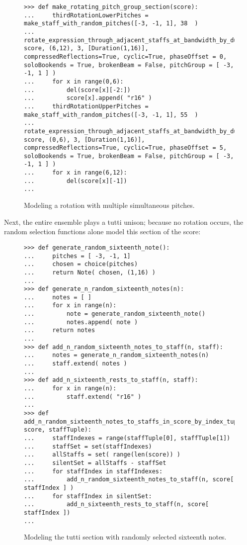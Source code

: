 \begin{figure}[H]
\begin{lstlisting}[basicstyle=\scriptsize\ttfamily, breaklines=True, tabsize=4, showtabs=false, showspaces=false]
>>> def make_rotating_pitch_group_section(score):
...     thirdRotationLowerPitches = make_staff_with_random_pitches([-3, -1, 1], 38  )   
...     rotate_expression_through_adjacent_staffs_at_bandwidth_by_durations(thirdRotationLowerPitches, score, (6,12), 3, [Duration(1,16)], compressedReflections=True, cyclic=True, phaseOffset = 0, soloBookends = True, brokenBeam = False, pitchGroup = [ -3, -1, 1 ] )
...     for x in range(0,6):
...         del(score[x][-2:])
...         score[x].append( "r16" )
...     thirdRotationUpperPitches = make_staff_with_random_pitches([-3, -1, 1], 55  )   
...     rotate_expression_through_adjacent_staffs_at_bandwidth_by_durations(thirdRotationUpperPitches, score, (0,6), 3, [Duration(1,16)], compressedReflections=True, cyclic=True, phaseOffset = 5, soloBookends = True, brokenBeam = False, pitchGroup = [ -3, -1, 1 ] )
...     for x in range(6,12):
...         del(score[x][-1])
... \end{lstlisting}

\caption{Modeling a rotation with multiple simultaneous pitches. } 
\end{figure}

Next, the entire ensemble plays a tutti unison; because no rotation occurs, the random selection functions alone model this section of the score:

\begin{figure}[H]
\begin{lstlisting}[basicstyle=\scriptsize\ttfamily, breaklines=True, tabsize=4, showtabs=false, showspaces=false]
>>> def generate_random_sixteenth_note():
...     pitches = [ -3, -1, 1]
...     chosen = choice(pitches)
...     return Note( chosen, (1,16) )
... 
>>> def generate_n_random_sixteenth_notes(n):
...     notes = [ ]
...     for x in range(n):
...         note = generate_random_sixteenth_note()
...         notes.append( note )
...     return notes
... 
>>> def add_n_random_sixteenth_notes_to_staff(n, staff):
...     notes = generate_n_random_sixteenth_notes(n)
...     staff.extend( notes )
... 
>>> def add_n_sixteenth_rests_to_staff(n, staff):
...     for x in range(n):
...         staff.extend( "r16" )
... 
>>> def add_n_random_sixteenth_notes_to_staffs_in_score_by_index_tuple(n, score, staffTuple):
...     staffIndexes = range(staffTuple[0], staffTuple[1])
...     staffSet = set(staffIndexes)
...     allStaffs = set( range(len(score)) )
...     silentSet = allStaffs - staffSet
...     for staffIndex in staffIndexes:
...         add_n_random_sixteenth_notes_to_staff(n, score[ staffIndex ] )
...     for staffIndex in silentSet:
...         add_n_sixteenth_rests_to_staff(n, score[ staffIndex ])
... \end{lstlisting}

\caption{Modeling the tutti section with randomly selected sixteenth notes. } 
\end{figure}

